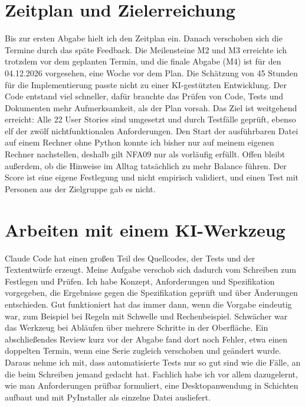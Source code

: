 \documentclass[abstract]{iu-pse}
\begin{document}
\section{Zeitplan und Zielerreichung}
Bis zur ersten Abgabe hielt ich den Zeitplan ein. Danach verschoben sich die Termine durch das späte Feedback. Die Meilensteine M2 und M3 erreichte ich trotzdem vor dem geplanten Termin, und die finale Abgabe (M4) ist für den 04.12.2026 vorgesehen, eine Woche vor dem Plan. Die Schätzung von 45 Stunden für die Implementierung passte nicht zu einer KI-gestützten Entwicklung. Der Code entstand viel schneller, dafür brauchte das Prüfen von Code, Tests und Dokumenten mehr Aufmerksamkeit, als der Plan vorsah. Das Ziel ist weitgehend erreicht: Alle 22 User Stories sind umgesetzt und durch Testfälle geprüft, ebenso elf der zwölf nichtfunktionalen Anforderungen. Den Start der ausführbaren Datei auf einem Rechner ohne Python konnte ich bisher nur auf meinem eigenen Rechner nachstellen, deshalb gilt NFA09 nur als vorläufig erfüllt. Offen bleibt außerdem, ob die Hinweise im Alltag tatsächlich zu mehr Balance führen. Der Score ist eine eigene Festlegung und nicht empirisch validiert, und einen Test mit Personen aus der Zielgruppe gab es nicht.

\section{Arbeiten mit einem KI-Werkzeug}
Claude Code hat einen großen Teil des Quellcodes, der Tests und der Textentwürfe erzeugt. Meine Aufgabe verschob sich dadurch vom Schreiben zum Festlegen und Prüfen. Ich habe Konzept, Anforderungen und Spezifikation vorgegeben, die Ergebnisse gegen die Spezifikation geprüft und über Änderungen entschieden. Gut funktioniert hat das immer dann, wenn die Vorgabe eindeutig war, zum Beispiel bei Regeln mit Schwelle und Rechenbeispiel. Schwächer war das Werkzeug bei Abläufen über mehrere Schritte in der Oberfläche. Ein abschließendes Review kurz vor der Abgabe fand dort noch Fehler, etwa einen doppelten Termin, wenn eine Serie zugleich verschoben und geändert wurde. Daraus nehme ich mit, dass automatisierte Tests nur so gut sind wie die Fälle, an die beim Schreiben jemand gedacht hat. Fachlich habe ich vor allem dazugelernt, wie man Anforderungen prüfbar formuliert, eine Desktopanwendung in Schichten aufbaut und mit PyInstaller als einzelne Datei ausliefert.
\end{document}
